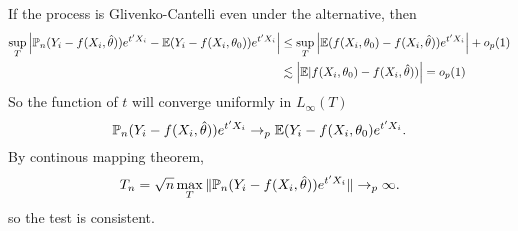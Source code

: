 \begin{example*}
	If the process is Glivenko-Cantelli even under the alternative, then 
	\begin{align*}
		\sup_T \left|\P_n(Y_i-f(X_i,\hat\theta))e^{t'X_i} - \E(Y_i-f(X_i,\theta_0))e^{t'X_i}\right| 
		&\leq  \sup_T\left|\E (f(X_i,\theta_0)-f(X_i,\hat\theta))e^{t'X_i}\right| + o_p(1)\\
		&\lesssim \left|\E|f(X_i,\theta_0)-f(X_i,\hat\theta))\right| = o_p(1)
	\end{align*}
	So the function of \(t\) will converge uniformly in \(L_\infty(T)\)
	\[
	\P_n(Y_i-f(X_i,\hat\theta))e^{t'X_i}\to_p \E(Y_i-f(X_i,\theta_0)e^{t'X_i} 
	.\]
	By continous mapping theorem, 
	\[
		T_n =\sqrt{n}\max_T\|\P_n(Y_i-f(X_i,\hat\theta))e^{t'X_i}\|\to_p\infty 
	.\] 
	so the test is consistent.
\end{example*}
